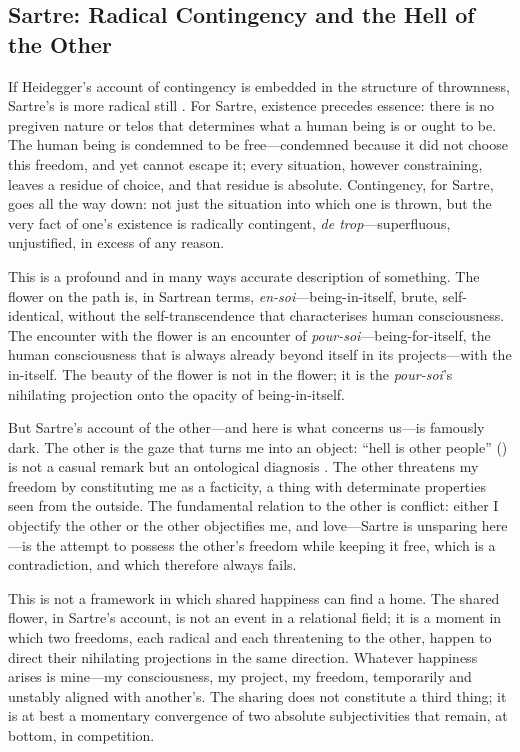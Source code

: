 \subsection{Sartre: Radical Contingency and the Hell of the Other}
\label{p14:subsec:sartre}

\noindent
If Heidegger's account of contingency is embedded in the structure of thrownness, Sartre's is more radical still \parencite{sartre1943}. For Sartre, existence precedes essence: there is no pregiven nature or telos that determines what a human being is or ought to be. The human being is condemned to be free---condemned because it did not choose this freedom, and yet cannot escape it; every situation, however constraining, leaves a residue of choice, and that residue is absolute. Contingency, for Sartre, goes all the way down: not just the situation into which one is thrown, but the very fact of one's existence is radically contingent, \emph{de trop}---superfluous, unjustified, in excess of any reason.

This is a profound and in many ways accurate description of something. The flower on the path is, in Sartrean terms, \emph{en-soi}---being-in-itself, brute, self-identical, without the self-transcendence that characterises human consciousness. The encounter with the flower is an encounter of \emph{pour-soi}---being-for-itself, the human consciousness that is always already beyond itself in its projects---with the in-itself. The beauty of the flower is not in the flower; it is the \emph{pour-soi}'s nihilating projection onto the opacity of being-in-itself.

But Sartre's account of the other---and here is what concerns us---is famously dark. The other is the gaze that turns me into an object: ``hell is other people'' () is not a casual remark but an ontological diagnosis \parencite{sartre1943}. The other threatens my freedom by constituting me as a facticity, a thing with determinate properties seen from the outside. The fundamental relation to the other is conflict: either I objectify the other or the other objectifies me, and love---Sartre is unsparing here---is the attempt to possess the other's freedom while keeping it free, which is a contradiction, and which therefore always fails.

This is not a framework in which shared happiness can find a home. The shared flower, in Sartre's account, is not an event in a relational field; it is a moment in which two freedoms, each radical and each threatening to the other, happen to direct their nihilating projections in the same direction. Whatever happiness arises is mine---my consciousness, my project, my freedom, temporarily and unstably aligned with another's. The sharing does not constitute a third thing; it is at best a momentary convergence of two absolute subjectivities that remain, at bottom, in competition.


